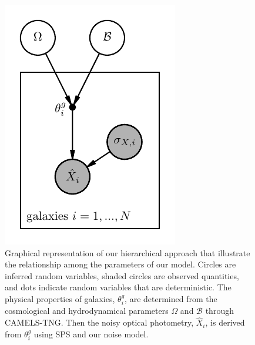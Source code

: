\begin{figure}[ht]
\vskip 0.2in
\begin{center}
    \centerline{\includegraphics[width=0.5\columnwidth]{figs/graph.pdf}}
    \caption{
        Graphical representation of our hierarchical approach that illustrate
        the relationship among the parameters of our model. 
        Circles are inferred random variables, shaded circles are observed
        quantities, and dots indicate random variables that are deterministic.
        The physical properties of galaxies, $\theta^g_i$, are determined from
        the cosmological and hydrodynamical parameters $\Omega$ and
        $\mathcal{B}$ through CAMELS-TNG. 
        Then the noisy optical photometry, $\hat{X}_i$, is derived from
        $\theta^g_i$ using SPS and our noise model. 
    }\label{fig:graph}
\end{center}
\vskip -0.2in
\end{figure}

